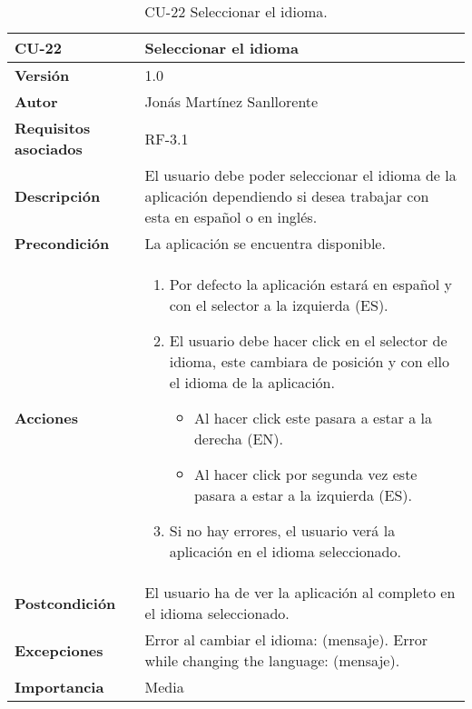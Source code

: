 \begin{table}[p]
	\centering
	\begin{tabularx}{\linewidth}{ p{} p{} }
		\toprule
		\textbf{CU-22}    & \textbf{Seleccionar el idioma}\\
		\toprule
		\textbf{Versión}              & 1.0    \\
		\textbf{Autor}                & Jonás Martínez Sanllorente \\
		\textbf{Requisitos asociados} & RF-3.1 \\
		\textbf{Descripción}          & El usuario debe poder seleccionar el idioma de la aplicación dependiendo si desea trabajar con esta en español o en inglés. \\
		\textbf{Precondición}         & La aplicación se encuentra disponible. \\
		\textbf{Acciones}             &
		\begin{enumerate}
			\def\labelenumi{\arabic{enumi}.}
			\tightlist
            \item Por defecto la aplicación estará en español y con el selector a la izquierda (ES).
			\item El usuario debe hacer click en el selector de idioma, este cambiara de posición y con ello el idioma de la aplicación.
            \begin{itemize}
                \item Al hacer click este pasara a estar a la derecha (EN).
                \item Al hacer click por segunda vez este pasara a estar a la izquierda (ES).
            \end{itemize}
            \item Si no hay errores, el usuario verá la aplicación en el idioma seleccionado.
		\end{enumerate}\\
		\textbf{Postcondición}        & El usuario ha de ver la aplicación al completo en el idioma seleccionado. \\
		\textbf{Excepciones}          & Error al cambiar el idioma: (mensaje).\newline
                                        Error while changing the language: (mensaje).\\
		\textbf{Importancia}          & Media \\
		\bottomrule
	\end{tabularx}
	\caption{CU-22 Seleccionar el idioma.}
\end{table}

